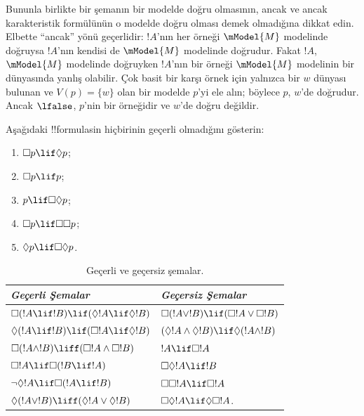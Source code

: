Bununla birlikte bir şemanın bir modelde doğru olmasının, ancak ve ancak
karakteristik formülünün o modelde doğru olması demek olmadığına dikkat
edin. Elbette ``ancak'' yönü geçerlidir: $!A$'nın her örneği
$\mModel{M}$ modelinde doğruysa $!A$'nın kendisi de $\mModel{M}$ modelinde
doğrudur. Fakat $!A$, $\mModel{M}$ modelinde doğruyken $!A$'nın bir örneği
$\mModel{M}$ modelinin bir dünyasında yanlış olabilir. Çok basit bir karşı
örnek için yalnızca bir $w$ dünyası bulunan ve $V(p) = \{w\}$ olan bir
modelde $p$'yi ele alın; böylece $p$, $w$'de doğrudur. Ancak $\lfalse$,
$p$'nin bir örneğidir ve $w$'de doğru değildir.

\begin{prob}
  Aşağıdaki !!{formula}s{}in hiçbirinin geçerli olmadığını gösterin:
  \begin{enumerate}
    \item[\Ax{D}:] \quad $\Box p \lif \Diamond p$;
    \item[\Ax{T}:] \quad $\Box p \lif p$;
    \item[\Ax{B}:] \quad $p \lif \Box\Diamond p$;
    \item[\Ax{4}:] \quad $\Box p \lif \Box \Box p$;
    \item[\Ax{5}:] \quad $\Diamond p \lif \Box \Diamond
      p$.
  \end{enumerate}
\end{prob}

\begin{table}[t]
    \centering
    \begin{tabular}{| l || l |}
      \hline
      {\emph{Geçerli Şemalar}} & {\emph{Geçersiz Şemalar}} \\
      \hline\hline
      $\Box(!A \lif !B) \lif (\Diamond !A \lif \Diamond !B)$
      & $\Box (!A \lor !B) \lif (\Box !A \lor \Box !B)$ \\
      $\Diamond (!A \lif !B) \lif (\Box !A \lif \Diamond
      !B)$
      & $(\Diamond !A \land \Diamond !B) \lif \Diamond (!A
      \land !B)$\\
      $\Box (!A \land !B) \liff (\Box !A \land \Box !B)$
      & $!A \lif \Box !A$ \\
      $\Box !A \lif \Box (!B \lif !A)$
      & $\Box \Diamond !A \lif !B$ \\
      $\lnot \Diamond !A \lif \Box (!A \lif !B)$
      & $\Box \Box !A \lif \Box !A$ \\
      $\Diamond (!A \lor !B) \liff (\Diamond !A \lor
      \Diamond !B)$
      & $\Box \Diamond !A \lif \Diamond \Box !A$. \\
      \hline
    \end{tabular}
    \caption{Geçerli ve geçersiz şemalar.}
\end{table}

